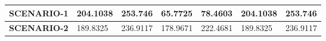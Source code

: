 \begin{table}[h]
\begin{tabular}{|cl|ll|ll|ll|}
			\multicolumn{2}{|c|}{\textbf{SCENARIO-1}}                & \multicolumn{1}{l|}{204.1038}                                                                                  & 253.746                                                                                                         & \multicolumn{1}{l|}{65.7725}                                                                                   & 78.4603                                                                                                         & \multicolumn{1}{l|}{204.1038}                                                                                  & 253.746                                                                                                         \\ \hline
			\multicolumn{2}{|c|}{\textbf{SCENARIO-2}}                & \multicolumn{1}{l|}{189.8325}                                                                                  & 236.9117                                                                                                        & \multicolumn{1}{l|}{178.9671}                                                                                  & 222.4681                                                                                                        & \multicolumn{1}{l|}{189.8325}                                                                                  & 236.9117                                                                                                        \\ \hline
		\end{tabular}
			
	\end{table}

